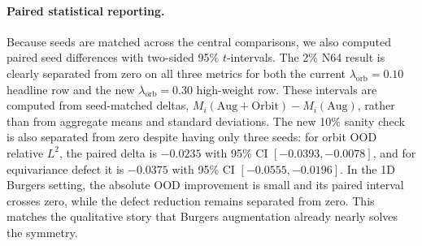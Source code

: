 \begin{table}[t]
\centering
\small
\caption{Absolute N64 Galilean label-efficiency metrics. This table complements percentage reductions with the underlying values.}
\label{tab:new-label-efficiency-absolute}
\end{table}

\paragraph{Paired statistical reporting.} Because seeds are matched across the central comparisons, we also computed paired seed differences with two-sided 95\% \(t\)-intervals. The 2\% N64 result is clearly separated from zero on all three metrics for both the current \(\lambda_{\mathrm{orb}}=0.10\) headline row and the new \(\lambda_{\mathrm{orb}}=0.30\) high-weight row. These intervals are computed from seed-matched deltas, \(M_i(\mathrm{Aug+Orbit})-M_i(\mathrm{Aug})\), rather than from aggregate means and standard deviations. The new 10\% sanity check is also separated from zero despite having only three seeds: for orbit OOD relative \(L^2\), the paired delta is \(-0.0235\) with 95\% CI \([-0.0393,-0.0078]\), and for equivariance defect it is \(-0.0375\) with 95\% CI \([-0.0555,-0.0196]\). In the 1D Burgers setting, the absolute OOD improvement is small and its paired interval crosses zero, while the defect reduction remains separated from zero. This matches the qualitative story that Burgers augmentation already nearly solves the symmetry.

